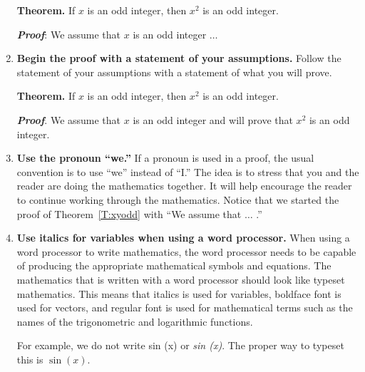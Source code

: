 \begin{enumerate}
\textbf{Theorem.} 
If  $x$  is an odd integer, then $x^2$ is an odd integer.

\textbf{\emph{Proof}}:  We assume that  $x$  is an odd integer  $\ldots$

\item \textbf{Begin the proof with a statement of your assumptions.}
Follow the statement of your assumptions with a statement of what you will prove.

\noindent
\textbf{Theorem.} 
If  $x$  is an odd integer, then $x^2$ is an odd integer.

\noindent
\emph{\textbf{Proof}}.  We assume that  $x$  is an odd integer and will prove that $x^2$   is an odd integer.

\item \textbf{Use the pronoun ``we.''}
If a pronoun is used in a proof, the usual convention is to use ``we'' instead of ``I.''  The idea is to stress that you and the reader are doing the mathematics together.  It will help encourage the reader to continue working through the mathematics.  Notice that we started the proof of Theorem~\ref{T:xyodd} with ``We assume that $\ldots$ .''




\item \textbf{Use italics for variables when using a word processor.}
When using a word processor to write mathematics, the word processor needs to be capable of producing the appropriate mathematical symbols and equations.  The mathematics that is written with a word processor should look like typeset mathematics.  This means that italics is used for variables, boldface font is used for vectors, and regular font is used for mathematical terms such as the names of the trigonometric and logarithmic functions.  

For example, we do not write sin (x) or \emph{sin (x)}.  The proper way to typeset this is $\sin (x)$.



%



\end{enumerate}
